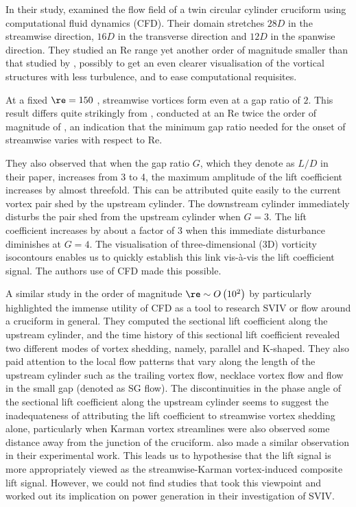 \documentclass[a4paper,fleqn]{cas-sc}
\begin{document}
In their study, \citet{Deng2007} examined the flow field of a twin circular cylinder cruciform using computational fluid dynamics (CFD). Their domain stretches  $28D$  in the streamwise direction,  $16D$  in the transverse direction and  $12D$  in the spanwise direction. They studied an Re range yet another order of magnitude smaller than that studied by \citet{Koide2017}, possibly to get an even clearer visualisation of the vortical structures with less turbulence, and to ease computational requisites.

At a fixed  $\re = 150$ , streamwise vortices form even at a gap ratio of $2$. This result differs quite strikingly from \citet{Koide2006,Koide2007}, conducted at an Re twice the order of magnitude of \citet{Deng2007}, an indication that the minimum gap ratio needed for the onset of streamwise varies with respect to Re.

They also observed that when the gap ratio $G$, which they denote as  $L/D$  in their paper, increases from 3 to 4, the maximum amplitude of the lift coefficient increases by almost threefold. This can be attributed quite easily to the current vortex pair shed by the upstream cylinder. The downstream cylinder immediately disturbs the pair shed from the upstream cylinder when  $G=3$. The lift coefficient increases by about a factor of 3 when this immediate disturbance diminishes at  $G=4$. The visualisation of three-dimensional (3D) vorticity isocontours enables us to quickly establish this link vis-\`{a}-vis the lift coefficient signal. The authors use of CFD made this possible.

A similar study in the order of magnitude $\re \sim O \left( 10^{2} \right)$ by \citet{Zhao2018a} particularly highlighted the immense utility of CFD as a tool to research SVIV or flow around a cruciform in general. They computed the sectional lift coefficient along the upstream cylinder, and the time history of this sectional lift coefficient revealed two different modes of vortex shedding, namely, parallel and K-shaped. They also paid attention to the local flow patterns that vary along the length of the upstream cylinder such as the trailing vortex flow, necklace vortex flow and flow in the small gap (denoted as SG flow). The discontinuities in the phase angle of the sectional lift coefficient along the upstream cylinder seems to suggest the inadequateness of attributing the lift coefficient to streamwise vortex shedding alone, particularly when Karman vortex streamlines were also observed some distance away from the junction of the cruciform. \citet{Shirakashi1989} also made a similar observation in their experimental work. This leads us to hypothesise that the lift signal is more appropriately viewed as the streamwise-Karman vortex-induced composite lift signal. However, we could not find studies that took this viewpoint and worked out its implication on power generation in their investigation of SVIV.
\end{document}
